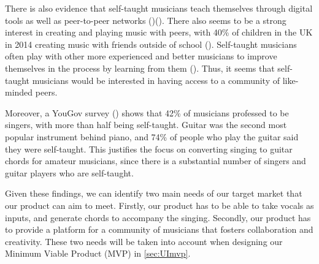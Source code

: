 There is also evidence that self-taught musicians teach themselves through digital tools as well as peer-to-peer networks (\cite{abrsm2014})(\cite{bookreview}). There also seems to be a strong interest in creating and playing music with peers, with 40\% of children in the UK in 2014 creating music with friends outside of school (\cite{abrsm2014}). Self-taught musicians often play with other more experienced and better musicians to improve themselves in the process by learning from them (\cite{marketresearch5}). Thus, it seems that self-taught musicians would be interested in having access to a community of like-minded peers. 
 
Moreover, a YouGov survey (\cite{YouGovMR}) shows that 42\% of musicians professed to be singers, with more than half being self-taught. Guitar was the second most popular instrument behind piano, and 74\% of people who play the guitar said they were self-taught. This justifies the focus on converting singing to guitar chords for amateur musicians, since there is a substantial number of singers and guitar players who are self-taught.  

Given these findings, we can identify two main needs of our target market that our product can aim to meet. Firstly, our product has to be able to take vocals as inputs, and generate chords to accompany the singing. Secondly, our product has to provide a platform for a community of musicians that fosters collaboration and creativity. These two needs will be taken into account when designing our Minimum Viable Product (MVP) in \cref{sec:UImvp}.


